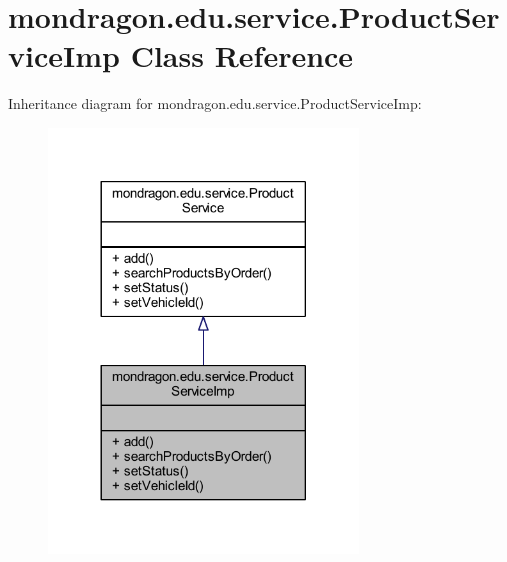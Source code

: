 \hypertarget{classmondragon_1_1edu_1_1service_1_1_product_service_imp}{}\section{mondragon.\+edu.\+service.\+Product\+Service\+Imp Class Reference}
\label{classmondragon_1_1edu_1_1service_1_1_product_service_imp}


Inheritance diagram for mondragon.\+edu.\+service.\+Product\+Service\+Imp\+:\nopagebreak
\begin{figure}[H]
\begin{center}
\leavevmode
\includegraphics[width=233pt]{classmondragon_1_1edu_1_1service_1_1_product_service_imp__inherit__graph}
\end{center}
\end{figure}



